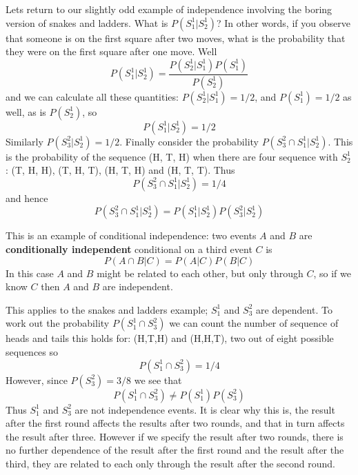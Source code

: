 \documentclass[11pt,a4paper]{scrartcl}
\begin{document}
Lets return to our slightly odd example of independence involving the
boring version of snakes and ladders. What is $P(S_1^1|S_2^1)$? In
other words, if you observe that someone is on the first square after
two moves, what is the probability that they were on the first square
after one move. Well
\begin{equation}
P(S_1^1|S_2^1)=\frac{P(S_2^1|S_1^1)P(S_1^1)}{P(S_2^1)}
\end{equation}
and we can calculate all these quantities: $P(S_2^1|S_1^1)=1/2$, and
$P(S_1^1)=1/2$ as well, as is $P(S_2^1)$, so
\begin{equation}
P(S_1^1|S_2^1)=1/2
\end{equation}
Similarly $P(S_3^2|S_2^1)=1/2$. Finally consider the probability
$P(S_3^2\cap S_1^1|S_2^1)$. This is the probability of the sequence
(H, T, H) when there are four sequence with $S_2^1$: (T, H, H), (T, H,
T), (H, T, H) and (H, T, T). Thus 
\begin{equation}
P(S_3^2\cap S_1^1|S_2^1)=1/4
\end{equation}
and hence
\begin{equation}
P(S_3^2\cap S_1^1|S_2^1)=P(S_1^1|S_2^1)P(S_3^2|S_2^1)
\end{equation}

This is an example of conditional independence: two events $A$ and $B$
are \textbf{conditionally independent} conditional on a third event
$C$ is
\begin{equation}
P(A\cap B|C)=P(A|C)P(B|C)
\end{equation}
In this case $A$ and $B$ might be related to each other, but only
through $C$, so if we know $C$ then $A$ and $B$ are independent. 

This applies to the snakes and ladders example; $S_1^1$ and $S_3^2$
are dependent. To work out the probability $P(S_1^1\cap S_3^2)$ we can
count the number of sequence of heads and tails this holds for:
(H,T,H) and (H,H,T), two out of eight possible sequences so
\begin{equation}
P(S_1^1\cap S_3^2)=1/4
\end{equation}
However, since $P(S_3^2)=3/8$ we see that 
\begin{equation}
P(S_1^1\cap S_3^2)\not = P(S_1^1)P(S_3^2)
\end{equation}
Thus $S_1^1$ and $S_3^2$ are not independence events. It is clear why
this is, the result after the first round affects the results after
two rounds, and that in turn affects the result after three. However
if we specify the result after two rounds, there is no further
dependence of the result after the first round and the result after
the third, they are related to each only through the result after the
second round.
\end{document}
